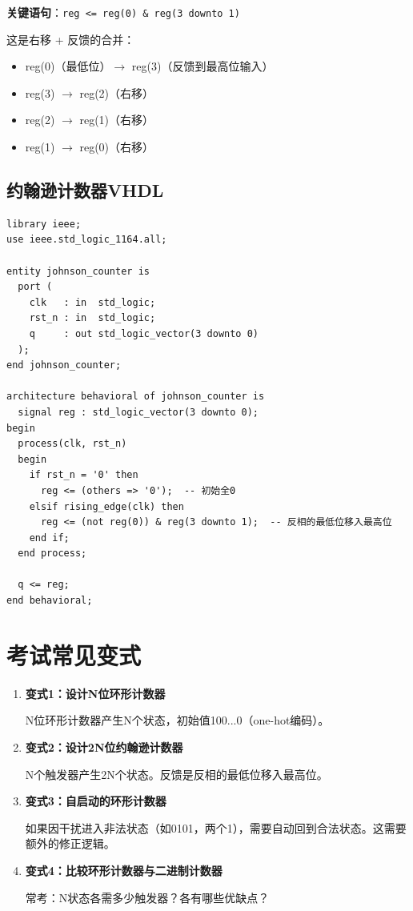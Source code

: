 \textbf{关键语句}：\texttt{reg <= reg(0) \& reg(3 downto 1)}

这是右移 + 反馈的合并：
\begin{itemize}
  \item reg(0)（最低位）$\to$ reg(3)（反馈到最高位输入）
  \item reg(3) $\to$ reg(2)（右移）
  \item reg(2) $\to$ reg(1)（右移）
  \item reg(1) $\to$ reg(0)（右移）
\end{itemize}

\subsection{约翰逊计数器VHDL}

\begin{lstlisting}[caption={4位约翰逊计数器（扭环形）}]
library ieee;
use ieee.std_logic_1164.all;

entity johnson_counter is
  port (
    clk   : in  std_logic;
    rst_n : in  std_logic;
    q     : out std_logic_vector(3 downto 0)
  );
end johnson_counter;

architecture behavioral of johnson_counter is
  signal reg : std_logic_vector(3 downto 0);
begin
  process(clk, rst_n)
  begin
    if rst_n = '0' then
      reg <= (others => '0');  -- 初始全0
    elsif rising_edge(clk) then
      reg <= (not reg(0)) & reg(3 downto 1);  -- 反相的最低位移入最高位
    end if;
  end process;

  q <= reg;
end behavioral;
\end{lstlisting}

\section{考试常见变式}

\begin{enumerate}
  \item \textbf{变式1：设计N位环形计数器}

  N位环形计数器产生N个状态，初始值100...0（one-hot编码）。

  \item \textbf{变式2：设计2N位约翰逊计数器}

  N个触发器产生2N个状态。反馈是反相的最低位移入最高位。

  \item \textbf{变式3：自启动的环形计数器}

  如果因干扰进入非法状态（如0101，两个1），需要自动回到合法状态。这需要额外的修正逻辑。

  \item \textbf{变式4：比较环形计数器与二进制计数器}

  常考：N状态各需多少触发器？各有哪些优缺点？
\end{enumerate}

